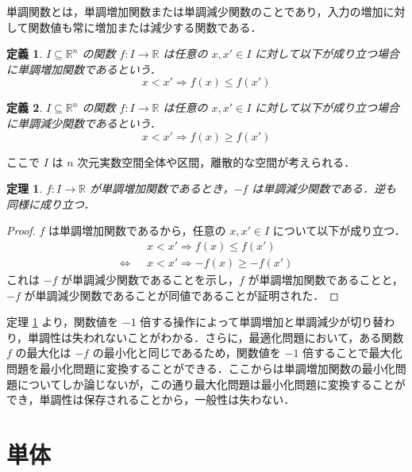 \documentclass[a4paper,11pt]{jreport}
\newtheorem{definition}{定義}
\newtheorem{theorem}{定理}
\begin{document}
単調関数とは，単調増加関数または単調減少関数のことであり，入力の増加に対して関数値も常に増加または減少する関数である．\\

\begin{definition}
$ I \subseteq \mathbb{R}^n $ の関数 $ f : I \to \mathbb{R} $ は任意の $ x, x' \in I $ に対して以下が成り立つ場合に単調増加関数であるという．
$$ x < x' \Rightarrow f(x) \leq f(x') $$
\end{definition}

\begin{definition}
$ I \subseteq \mathbb{R}^n $ の関数 $ f : I \to \mathbb{R} $ は任意の $ x, x' \in I $ に対して以下が成り立つ場合に単調減少関数であるという．
$$ x < x' \Rightarrow f(x) \geq f(x') $$
\end{definition}

ここで $ I $ は $ n $ 次元実数空間全体や区間，離散的な空間が考えられる．\\

\begin{theorem} \label{keeping_monotonicity}
$ f : I \to \mathbb{R} $ が単調増加関数であるとき，$ -f $ は単調減少関数である．逆も同様に成り立つ．
\end{theorem}

\begin{proof}
$ f $ は単調増加関数であるから，任意の $ x, x' \in I $ について以下が成り立つ．
\begin{align*}
& x < x' \Rightarrow f(x) \leq f(x') \\
\Longleftrightarrow \hspace{8pt} & x < x' \Rightarrow -f(x) \geq -f(x')
\end{align*}
これは $ -f $ が単調減少関数であることを示し，$ f $ が単調増加関数であることと，$ -f $ が単調減少関数であることが同値であることが証明された．
\end{proof}

定理 \ref{keeping_monotonicity} より，関数値を $ -1 $ 倍する操作によって単調増加と単調減少が切り替わり，単調性は失われないことがわかる．さらに，最適化問題において，ある関数 $ f $ の最大化は $ -f $ の最小化と同じであるため，関数値を $ -1 $ 倍することで最大化問題を最小化問題に変換することができる．ここからは単調増加関数の最小化問題についてしか論じないが，この通り最大化問題は最小化問題に変換することができ，単調性は保存されることから，一般性は失わない．

\section{単体}
\end{document}
